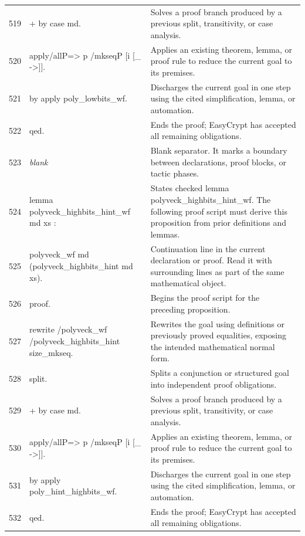 \documentclass[10pt]{article}
\begin{document}
\begin{longtable}{r L{0.53\textwidth} L{0.37\textwidth}}
519 & {\ttfamily\scriptsize + by case md.} & Solves a proof branch produced by a previous split, transitivity, or case analysis. \\
520 & {\ttfamily\scriptsize apply/allP=> p /mkseqP [i [\_ ->]].} & Applies an existing theorem, lemma, or proof rule to reduce the current goal to its premises. \\
521 & {\ttfamily\scriptsize by apply poly\_lowbits\_wf.} & Discharges the current goal in one step using the cited simplification, lemma, or automation. \\
522 & {\ttfamily\scriptsize qed.} & Ends the proof; EasyCrypt has accepted all remaining obligations. \\
523 & {\ttfamily\scriptsize \emph{blank}} & Blank separator.  It marks a boundary between declarations, proof blocks, or tactic phases. \\
524 & {\ttfamily\scriptsize lemma polyveck\_highbits\_hint\_wf md xs :} & States checked lemma polyveck\_highbits\_hint\_wf.  The following proof script must derive this proposition from prior definitions and lemmas. \\
525 & {\ttfamily\scriptsize   polyveck\_wf md (polyveck\_highbits\_hint md xs).} & Continuation line in the current declaration or proof.  Read it with surrounding lines as part of the same mathematical object. \\
526 & {\ttfamily\scriptsize proof.} & Begins the proof script for the preceding proposition. \\
527 & {\ttfamily\scriptsize rewrite /polyveck\_wf /polyveck\_highbits\_hint size\_mkseq.} & Rewrites the goal using definitions or previously proved equalities, exposing the intended mathematical normal form. \\
528 & {\ttfamily\scriptsize split.} & Splits a conjunction or structured goal into independent proof obligations. \\
529 & {\ttfamily\scriptsize + by case md.} & Solves a proof branch produced by a previous split, transitivity, or case analysis. \\
530 & {\ttfamily\scriptsize apply/allP=> p /mkseqP [i [\_ ->]].} & Applies an existing theorem, lemma, or proof rule to reduce the current goal to its premises. \\
531 & {\ttfamily\scriptsize by apply poly\_hint\_highbits\_wf.} & Discharges the current goal in one step using the cited simplification, lemma, or automation. \\
532 & {\ttfamily\scriptsize qed.} & Ends the proof; EasyCrypt has accepted all remaining obligations. \\

\end{longtable}
\end{document}
